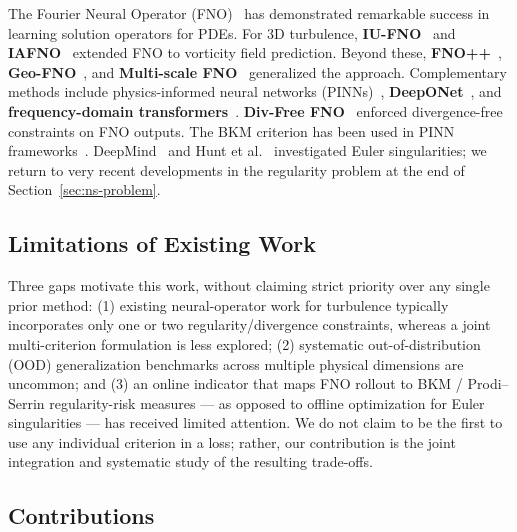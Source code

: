 \documentclass[review]{elsarticle}
\begin{document}
The Fourier Neural Operator (FNO)~\cite{li2021fourier} has demonstrated remarkable success in learning solution operators for PDEs. For 3D turbulence, \textbf{IU-FNO}~\cite{li2023iufno} and \textbf{IAFNO}~\cite{jiang2025iafno} extended FNO to vorticity field prediction. Beyond these, \textbf{FNO++}~\cite{li2022fnoplus}, \textbf{Geo-FNO}~\cite{li2023geofno}, and \textbf{Multi-scale FNO}~\cite{dwivedi2023multiscale} generalized the approach. Complementary methods include physics-informed neural networks (PINNs)~\cite{raissi2019pinns}, \textbf{DeepONet}~\cite{lu2021deeponet}, and \textbf{frequency-domain transformers}~\cite{chen2023transformer}. \textbf{Div-Free FNO}~\cite{toshev2023divfree} enforced divergence-free constraints on FNO outputs. The BKM criterion has been used in PINN frameworks~\cite{wang2021pinnpathology}. DeepMind~\cite{wang2025singularity} and Hunt et al.~\cite{hunt2023euler} investigated Euler singularities; we return to very recent developments in the regularity problem at the end of Section~\ref{sec:ns-problem}.

\subsection{Limitations of Existing Work}
\label{sec:limitations-existing}

Three gaps motivate this work, without claiming strict priority over any single prior method:
(1) existing neural-operator work for turbulence typically incorporates only one or two
regularity/divergence constraints, whereas a joint multi-criterion formulation is less explored;
(2) systematic out-of-distribution (OOD) generalization benchmarks across multiple physical
dimensions are uncommon; and (3) an online indicator that maps FNO rollout to BKM / Prodi--Serrin
regularity-risk measures --- as opposed to offline optimization for Euler singularities --- has
received limited attention. We do not claim to be the first to use any individual criterion in a
loss; rather, our contribution is the joint integration and systematic study of the resulting
trade-offs.

\subsection{Contributions}
\label{sec:contributions}
\end{document}
